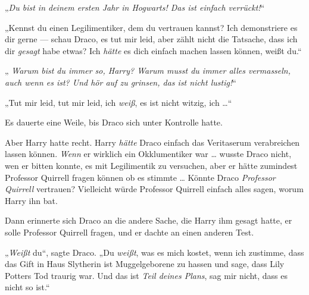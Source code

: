 „\emph{Du bist in deinem ersten Jahr in Hogwarts! Das ist einfach verrückt!}“

„Kennst du einen Legilimentiker, dem du vertrauen kannst? Ich demonstriere es dir gerne — schau Draco, es tut mir leid, aber zählt nicht die Tatsache, dass ich dir \emph{gesagt} habe etwas? Ich \emph{hätte} es dich einfach machen lassen können, weißt du.“

„\emph{ Warum bist du immer so, Harry? Warum musst du immer alles vermasseln, auch wenn es  ist? Und hör auf zu grinsen, das ist nicht lustig!}“

„Tut mir leid, tut mir leid, ich \emph{weiß}, es ist nicht witzig, ich …“

Es dauerte eine Weile, bis Draco sich unter Kontrolle hatte.

Aber Harry hatte recht. Harry \emph{hätte} Draco einfach das Veritaserum verabreichen lassen können. \emph{Wenn} er wirklich ein Okklumentiker war … wusste Draco nicht, wen er bitten konnte, es mit Legilimentik zu versuchen, aber er hätte zumindest Professor Quirrell fragen können ob es stimmte … Könnte Draco \emph{Professor Quirrell} vertrauen? Vielleicht würde Professor Quirrell einfach alles sagen, worum Harry ihn bat.

Dann erinnerte sich Draco an die andere Sache, die Harry ihm gesagt hatte, er solle Professor Quirrell fragen, und er dachte an einen anderen Test.

„\emph{Weißt} du“, sagte Draco.
„Du \emph{weißt}, was es mich kostet, wenn ich zustimme, dass das Gift in Haus Slytherin ist Muggelgeborene zu hassen und sage, dass Lily Potters Tod traurig war. Und das ist \emph{Teil deines Plans}, sag mir nicht, dass es nicht so ist.“

